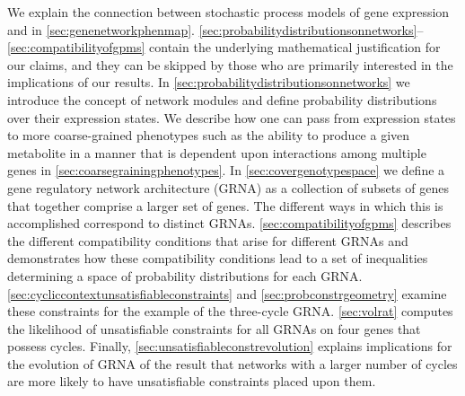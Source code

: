 We explain the connection between stochastic process models of gene expression and \gnpm{} in \ref{sec:genenetworkphenmap}. \ref{sec:probabilitydistributionsonnetworks}--\ref{sec:compatibilityofgpms} contain the underlying mathematical justification for our claims, and they can be skipped by those who are primarily interested in the implications of our results. In \ref{sec:probabilitydistributionsonnetworks} we introduce the concept of network modules and define probability distributions over their expression states. We describe how one can pass from expression states to more coarse-grained phenotypes such as the ability to produce a given metabolite in a manner that is dependent upon interactions among multiple genes in \ref{sec:coarsegrainingphenotypes}. In \ref{sec:covergenotypespace} we define a gene regulatory network architecture (GRNA) as a collection of subsets of genes that together comprise a larger set of genes. The different ways in which this is accomplished correspond to distinct GRNAs. \ref{sec:compatibilityofgpms} describes the different compatibility conditions that arise for different GRNAs and demonstrates how these compatibility conditions lead to a set of inequalities determining a space of probability distributions for each GRNA. \ref{sec:cycliccontextunsatisfiableconstraints} and \ref{sec:probconstrgeometry} examine these constraints for the example of the three-cycle GRNA. \ref{sec:volrat} computes the likelihood of unsatisfiable constraints for all GRNAs on four genes that possess cycles. Finally, \ref{sec:unsatisfiableconstrevolution} explains implications for the evolution of GRNA of the result that networks with a larger number of cycles are more likely to have unsatisfiable constraints placed upon them.


